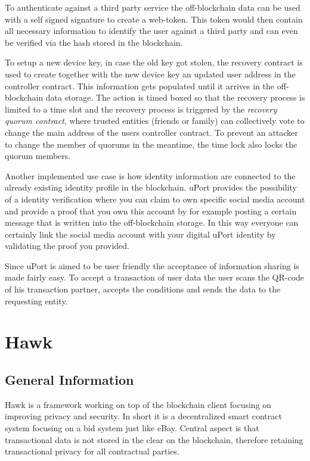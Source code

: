 To authenticate against a third party service the off-blockchain data can be used with a self signed signature to create a web-token. This token would then contain all necessary information to identify the user against a third party and can even be verified via the hash stored in the blockchain.

To setup a new device key, in case the old key got stolen, the recovery contract is used to create together with the new device key an updated user address in the controller contract. This information gets populated until it arrives in the off-blockchain data storage. The action is timed boxed so that the recovery process is limited to a time slot and the recovery process is triggered by the \textit{recovery quorum contract}, where trusted entities (friends or family) can collectively vote to change the main address of the users controller contract. To prevent an attacker to change the member of quorums in the meantime, the time lock also locks the quorum members.

Another implemented use case is how identity information are connected to the already existing identity profile in the blockchain. uPort provides the possibility of a identity verification where you can claim to own specific social media account and provide a proof that you own this account by  for example posting a certain message that is written into the off-blockchain storage. In this way everyone can certainly link the social media account with your digital uPort identity by validating the proof you provided.

Since uPort is aimed to be user friendly the acceptance of information sharing is made fairly easy. To accept a transaction of user data the user scans the QR-code of his transaction partner, accepts the conditions and sends the data to the requesting entity.

\section{Hawk}
\subsection{General Information}
Hawk is a framework working on top of the blockchain client focusing on improving privacy and security. In short it is a decentralized smart contract system focusing on a bid system just like eBay. Central aspect is that transactional data is not stored in the clear on the blockchain, therefore retaining transactional privacy for all contractual parties.

